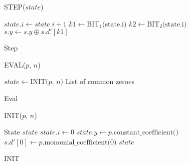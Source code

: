 \begin{figure}
    \begin{minipage}[t]{.5\linewidth}
        \begin{alg}
            \caption{STEP($state$)}\label{alg:fes_step}
            $state.i \gets state.i + 1$\;
            $k1 \gets \text{BIT}_1\text{(state.i)}$\;
            $k2 \gets \text{BIT}_2\text{(state.i)}$\;
            $s.y \gets s.y \oplus s.d'[k1]$\;
        \end{alg}
        \caption{Step}
        \label{sec2:alg:fes_step}
    \end{minipage}
    \begin{minipage}[t]{.5\linewidth}
        \begin{alg}
            \caption{EVAL($p$, $n$)}\label{alg:fes_eval}
            $state \gets \text{INIT($p$, $n$)}$\;
            \Return List of common zeroes
        \end{alg}
        \caption{Eval}
        \label{sec2:alg:fes_eval}
    \end{minipage}
    \begin{minipage}[H]{\linewidth}
        \begin{alg}
            \caption{INIT($p$, $n$)}\label{alg:fes_init}
            State $state$\;
            $state.i \gets 0$\;
            $state.y \gets p.\text{constant\_coefficient()}$\;
            $s.d'[0] \gets p.\text{monomial\_coefficient(0)}$\;
            \Return $state$\;
        \end{alg}
        \label{sec2:alg:fes_init}
    \end{minipage}
    \caption{INIT}
    \label{fig:fes_subparts}
\end{figure}

